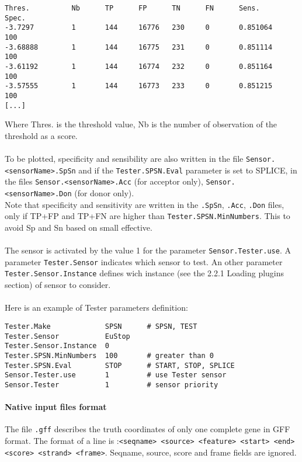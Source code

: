 \begin{Verbatim}[fontsize=\small]
Thres.          Nb      TP      FP      TN      FN      Sens.           Spec.
-3.7297         1       144     16776   230     0       0.851064        100
-3.68888        1       144     16775   231     0       0.851114        100
-3.61192        1       144     16774   232     0       0.851164        100
-3.57555        1       144     16773   233     0       0.851215        100
[...]
\end{Verbatim}
Where Thres. is the threshold value, Nb is the number of observation of the threshold as a score.\\ 
\\ 
To be plotted, specificity and sensibility are also written in the file \texttt{Sensor.<sensorName>.SpSn} and if the \texttt{Tester.SPSN.Eval} parameter is set to SPLICE, in the files 
\texttt{Sensor.<sensorName>.Acc} (for acceptor only), \texttt{Sensor.<sensorName>.Don} (for donor only).\\ 
Note that specificity and sensitivity are written in the \texttt{.SpSn}, \texttt{.Acc}, \texttt{.Don} files, only if TP+FP and TP+FN are higher than \texttt{Tester.SPSN.MinNumbers}. This to avoid Sp and Sn based on small effective.\\
\\
The sensor is activated by the value 1 for the parameter
\texttt{Sensor.Tester.use}. A parameter \texttt{Tester.Sensor} indicates which sensor to test. An other parameter \texttt{Tester.Sensor.Instance} defines wich instance (see the 2.2.1 Loading plugins section) of sensor to consider.\\
\\
Here is an example of Tester parameters definition:
\begin{Verbatim}[fontsize=\small]
Tester.Make             SPSN      # SPSN, TEST
Tester.Sensor           EuStop
Tester.Sensor.Instance  0
Tester.SPSN.MinNumbers  100       # greater than 0
Tester.SPSN.Eval        STOP      # START, STOP, SPLICE
Sensor.Tester.use       1         # use Tester sensor
Sensor.Tester           1         # sensor priority
\end{Verbatim}

\paragraph{Native input files format}

The file \texttt{.gff} describes the truth coordinates of only one complete gene in GFF format. The format of a
line is :\texttt{<seqname> <source> <feature> <start> <end> <score> <strand> <frame>}. Seqname, source, score and frame fields are ignored.

